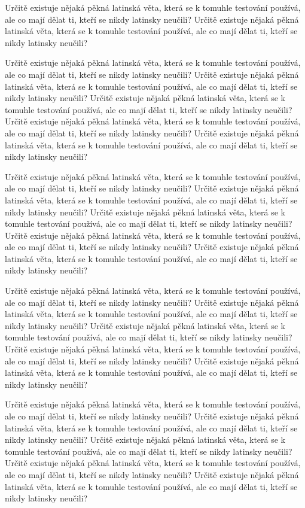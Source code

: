 \documentclass[11pt,oneside,a4paper]{book}
\begin{document}
	Určitě existuje nějaká pěkná latinská věta, která se k tomuhle testování používá, ale co mají dělat ti, kteří se nikdy latinsky neučili? Určitě existuje nějaká pěkná latinská věta, která se k tomuhle testování používá, ale co mají dělat ti, kteří se nikdy latinsky neučili?
	
	Určitě existuje nějaká pěkná latinská věta, která se k tomuhle testování používá, ale co mají dělat ti, kteří se nikdy latinsky neučili? Určitě existuje nějaká pěkná latinská věta, která se k tomuhle testování používá, ale co mají dělat ti, kteří se nikdy latinsky neučili? Určitě existuje nějaká pěkná latinská věta, která se k tomuhle testování používá, ale co mají dělat ti, kteří se nikdy latinsky neučili? Určitě existuje nějaká pěkná latinská věta, která se k tomuhle testování používá, ale co mají dělat ti, kteří se nikdy latinsky neučili? Určitě existuje nějaká pěkná latinská věta, která se k tomuhle testování používá, ale co mají dělat ti, kteří se nikdy latinsky neučili?
	
	Určitě existuje nějaká pěkná latinská věta, která se k tomuhle testování používá, ale co mají dělat ti, kteří se nikdy latinsky neučili? Určitě existuje nějaká pěkná latinská věta, která se k tomuhle testování používá, ale co mají dělat ti, kteří se nikdy latinsky neučili? Určitě existuje nějaká pěkná latinská věta, která se k tomuhle testování používá, ale co mají dělat ti, kteří se nikdy latinsky neučili? Určitě existuje nějaká pěkná latinská věta, která se k tomuhle testování používá, ale co mají dělat ti, kteří se nikdy latinsky neučili? Určitě existuje nějaká pěkná latinská věta, která se k tomuhle testování používá, ale co mají dělat ti, kteří se nikdy latinsky neučili?
	
	Určitě existuje nějaká pěkná latinská věta, která se k tomuhle testování používá, ale co mají dělat ti, kteří se nikdy latinsky neučili? Určitě existuje nějaká pěkná latinská věta, která se k tomuhle testování používá, ale co mají dělat ti, kteří se nikdy latinsky neučili? Určitě existuje nějaká pěkná latinská věta, která se k tomuhle testování používá, ale co mají dělat ti, kteří se nikdy latinsky neučili? Určitě existuje nějaká pěkná latinská věta, která se k tomuhle testování používá, ale co mají dělat ti, kteří se nikdy latinsky neučili? Určitě existuje nějaká pěkná latinská věta, která se k tomuhle testování používá, ale co mají dělat ti, kteří se nikdy latinsky neučili?
	
	Určitě existuje nějaká pěkná latinská věta, která se k tomuhle testování používá, ale co mají dělat ti, kteří se nikdy latinsky neučili? Určitě existuje nějaká pěkná latinská věta, která se k tomuhle testování používá, ale co mají dělat ti, kteří se nikdy latinsky neučili? Určitě existuje nějaká pěkná latinská věta, která se k tomuhle testování používá, ale co mají dělat ti, kteří se nikdy latinsky neučili? Určitě existuje nějaká pěkná latinská věta, která se k tomuhle testování používá, ale co mají dělat ti, kteří se nikdy latinsky neučili? Určitě existuje nějaká pěkná latinská věta, která se k tomuhle testování používá, ale co mají dělat ti, kteří se nikdy latinsky neučili?
	
\end{document}
